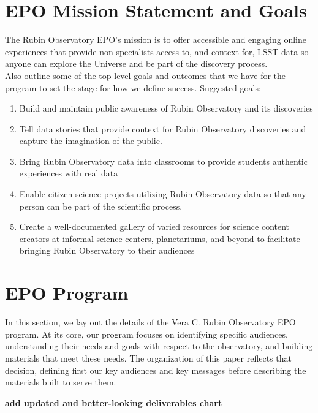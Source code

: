 \section{EPO Mission Statement and Goals}\label{sec:mission}
The Rubin Observatory EPO's mission is to offer accessible and engaging online experiences that provide non-specialists access to, and context for, LSST data so anyone can explore the Universe and be part of the discovery process. \\

Also outline some of the top level goals and outcomes that we have for the program to set the stage for how we define success.
Suggested goals:
\begin{enumerate}
    \item Build and maintain public awareness of Rubin Observatory and its discoveries
    \item Tell data stories that provide context for Rubin Observatory discoveries and capture the imagination of the public.
    \item Bring Rubin Observatory data into classrooms to provide students authentic experiences with real data
    \item Enable citizen science projects utilizing Rubin Observatory data so that any person can be part of the scientific process. 
    \item Create a well-documented gallery of varied resources for science content creators at informal science centers, planetariums, and beyond to facilitate bringing Rubin Observatory to their audiences
\end{enumerate}


\section{EPO Program}\label{sec:program}
In this section, we lay out the details of the Vera C. Rubin Observatory EPO program. At its core, our program focuses on identifying specific audiences, understanding their needs and goals with respect to the observatory, and building materials that meet these needs. The organization of this paper reflects that decision, defining first our key audiences and key messages before describing the materials built to serve them.

{\bf add updated and better-looking deliverables chart}

